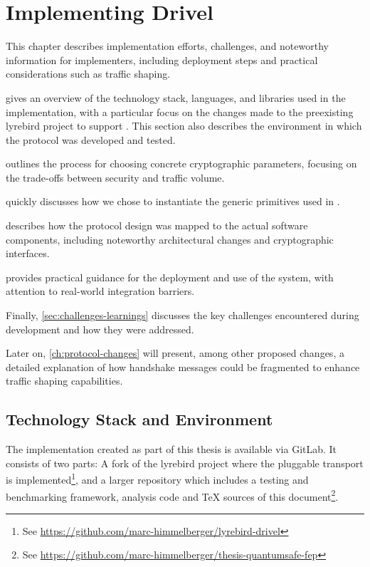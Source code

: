 \chapter{Implementing Drivel}\label{ch:implementation}

This chapter describes implementation efforts, challenges, and noteworthy information for implementers, including deployment steps and practical considerations such as traffic shaping.

 gives an overview of the technology stack, languages, and libraries used in the implementation, with a particular focus on the changes made to the preexisting lyrebird project \cite{lyrebird} to support \drivel{}. This section also describes the environment in which the protocol was developed and tested.

 outlines the process for choosing concrete cryptographic parameters, focusing on the trade-offs between security and traffic volume.

 quickly discusses how we chose to instantiate the generic primitives used in \drivel{}.

 describes how the protocol design was mapped to the actual software components, including noteworthy architectural changes and cryptographic interfaces.

 provides practical guidance for the deployment and use of the system, with attention to real-world integration barriers.

Finally, \cref{sec:challenges-learnings} discusses the key challenges encountered during development and how they were addressed.

Later on, \cref{ch:protocol-changes} will present, among other proposed changes, a detailed explanation of how handshake messages could be fragmented to enhance traffic shaping capabilities.

\section{Technology Stack and Environment} \label{sec:tech-stack}

The implementation created as part of this thesis is available via GitLab. It consists of two parts: A fork of the lyrebird project \cite{lyrebird} where the \drivel{} pluggable transport is implemented\footnote{See \url{https://github.com/marc-himmelberger/lyrebird-drivel}}, and a larger repository which includes a testing and benchmarking framework, analysis code and TeX sources of this document\footnote{See \url{https://github.com/marc-himmelberger/thesis-quantumsafe-fep}}.

